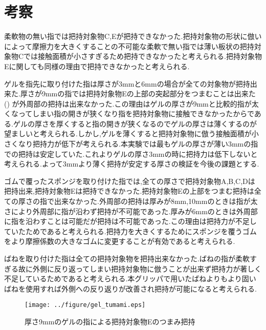 \section{考察}
柔軟物の無い指では把持対象物C,Eが把持できなかった.把持対象物の形状に倣いによって摩擦力を大きくすることの不可能な柔軟で無い指では薄い板状の把持対象物Cでは接触面積が小さすぎるため把持できなかったと考えられる.把持対象物Eに関しても同様の理由で把持できなかったと考えられる.\par
ゲルを指先に取り付けた指は厚さが3mmと6mmの場合が全ての対象物が把持出来た.厚さが9mmの指では把持対象物Eの上部の突起部分をつまむことは出来た () が外周部の把持は出来なかった.この理由はゲルの厚さが9mmと比較的指が太くなってしまい指の開きが狭くなり指を把持対象物に接触できなかったからである.ゲルの厚さを厚くすると指の開きが狭くなるのでゲルの厚さは薄くするのが望ましいと考えられる.しかし,ゲルを薄くすると把持対象物に倣う接触面積が小さくなり把持力が低下が考えられる.本実験では最もゲルの厚さが薄い3mmの指での把持は安定していた.これよりゲルの厚さ3mmの時に把持力は低下しないと考えられる.よって3mmより薄く把持が安定する厚さの検証を今後の課題とする.\par
ゴムで覆ったスポンジを取り付けた指では,全ての厚さで把持対象物A,B,C,Dは把持出来,把持対象物Eは把持できなかった.把持対象物Eの上部をつまむ把持は全ての厚さの指で出来なかった.外周部の把持は厚みが8mm,10mmのときは指が太さにより外周部に指が沿わず把持が不可能であった.厚みが6mmのときは外周部に指を沿わすことは可能だが把持は不可能であった.この理由は把持力が不足していたためであると考えられる.把持力を大きくするためにスポンジを覆うゴムをより摩擦係数の大きなゴムに変更することが有効であると考えられる.\par
ばねを取り付けた指は全ての把持対象物を把持出来なかった.ばねの指が柔軟すぎる故に外側に反り返ってしまい把持対象物に倣うことが出来ず把持力が著しく不足しているためであると考えられる.本グリッパで用いたばねよりもより固いばねを使用すれば外側への反り返りが改善され把持が可能になると考えられる.

\begin{figure}[h]
 \begin{center}
  \texttt{[image: ../figure/gel\_tumami.eps]}
 \caption{厚さ9mmのゲルの指による把持対象物Eのつまみ把持}
  \label{fig::gel_tumami}
 \end{center}
\end{figure}


